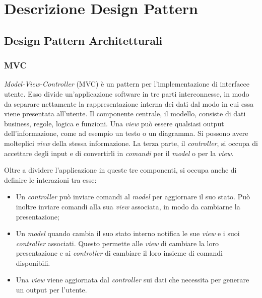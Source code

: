\pagebreak
\section{Descrizione Design Pattern}
\label{appendice-pattern}

\subsection{Design Pattern Architetturali}

\subsubsection{MVC}

\textit{Model-View-Controller} (MVC) è un pattern per l'implementazione di interfacce utente. Esso divide un'applicazione software in tre parti interconnesse, in modo da separare nettamente la rappresentazione interna dei dati dal modo in cui essa viene presentata all'utente. Il componente centrale, il modello, consiste di dati business, regole, logica e funzioni. Una \textit{view} può essere qualsiasi output dell'informazione, come ad esempio un testo o un diagramma. Si possono avere molteplici \textit{view} della stessa informazione. La terza parte, il \textit{controller}, si occupa di accettare degli input e di convertirli in \textit{comandi} per il \textit{model} o per la \textit{view}.

Oltre a dividere l'applicazione in queste tre componenti,  si occupa anche di definire le interazioni tra esse:

\begin{itemize}

	\item Un \textit{controller} può inviare comandi al \textit{model} per aggiornare il suo stato. Può inoltre inviare comandi alla sua \textit{view} associata, in modo da cambiarne la presentazione;
	\item Un \textit{model} quando cambia il suo stato interno notifica le sue \textit{view} e i suoi \textit{controller} associati. Questo permette alle \textit{view} di cambiare la loro presentazione e ai \textit{controller} di cambiare il loro insieme di comandi disponibili. 
	\item Una \textit{view} viene aggiornata dal \textit{controller} sui dati che necessita per generare un output per l'utente.

\end{itemize}

